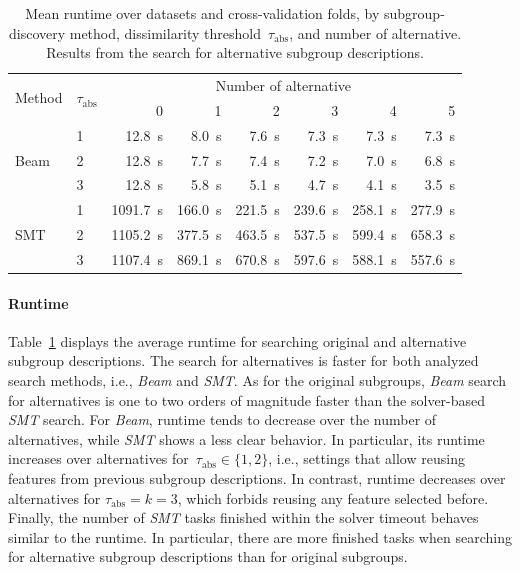 \documentclass{article}
\theoremstyle{definition}
\begin{document}
\begin{table}[t]
	\centering
	\begin{tabular}{llrrrrrr}
		\toprule
		\multirow{2}{*}{Method} & \multirow{2}{*}{$\tau_{\text{abs}}$} & \multicolumn{6}{c}{Number of alternative} \\
		\cmidrule(lr){3-8}
		& &  0 & 1 & 2 & 3 & 4 & 5 \\
		\midrule
		\multirow[t]{3}{*}{Beam} & 1 & 12.8~s & 8.0~s & 7.6~s & 7.3~s & 7.3~s & 7.3~s \\
		& 2 & 12.8~s & 7.7~s & 7.4~s & 7.2~s & 7.0~s & 6.8~s \\
		& 3 & 12.8~s & 5.8~s & 5.1~s & 4.7~s & 4.1~s & 3.5~s \\
		\multirow[t]{3}{*}{SMT} & 1 & 1091.7~s & 166.0~s & 221.5~s & 239.6~s & 258.1~s & 277.9~s \\
		& 2 & 1105.2~s & 377.5~s & 463.5~s & 537.5~s & 599.4~s & 658.3~s \\
		& 3 & 1107.4~s & 869.1~s & 670.8~s & 597.6~s & 588.1~s & 557.6~s \\
		\bottomrule
	\end{tabular}
	\caption{
		Mean runtime over datasets and cross-validation folds, by subgroup-discovery method, dissimilarity threshold~$\tau_{\text{abs}}$, and number of alternative.
		Results from the search for alternative subgroup descriptions.
	}
	\label{tab:csd:alteratives-runtime}
\end{table}

\paragraph{Runtime}

Table~\ref{tab:csd:alteratives-runtime} displays the average runtime for searching original and alternative subgroup descriptions.
The search for alternatives is faster for both analyzed search methods, i.e., \emph{Beam} and \emph{SMT}.
As for the original subgroups, \emph{Beam} search for alternatives is one to two orders of magnitude faster than the solver-based \emph{SMT} search.
For \emph{Beam}, runtime tends to decrease over the number of alternatives, while \emph{SMT} shows a less clear behavior.
In particular, its runtime increases over alternatives for~$\tau_{\text{abs}} \in \{1, 2\}$, i.e., settings that allow reusing features from previous subgroup descriptions.
In contrast, runtime decreases over alternatives for $\tau_{\text{abs}} = k = 3$, which forbids reusing any feature selected before.
Finally, the number of \emph{SMT} tasks finished within the solver timeout behaves similar to the runtime.
In particular, there are more finished tasks when searching for alternative subgroup descriptions than for original subgroups.
\end{document}
